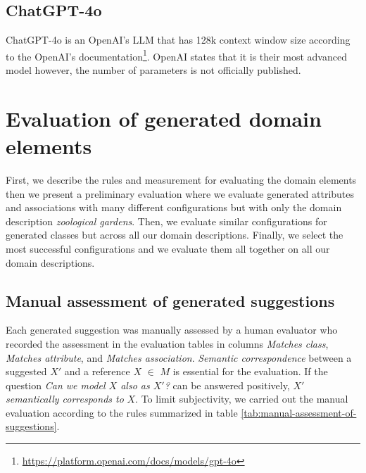 \subsection{ChatGPT-4o}

ChatGPT-4o is an OpenAI's LLM that has 128k context window size according to the OpenAI's documentation\footnote{\url{https://platform.openai.com/docs/models/gpt-4o}}. OpenAI states that it is their most advanced model however, the number of parameters is not officially published.


\section{Evaluation of generated domain elements}

First, we describe the rules and measurement for evaluating the domain elements then we present a preliminary evaluation where we evaluate generated attributes and associations with many different configurations but with only the domain description \textit{zoological gardens}. Then, we evaluate similar configurations for generated classes but across all our domain descriptions. Finally, we select the most successful configurations and we evaluate them all together on all our domain descriptions.


\subsection{Manual assessment of generated suggestions}

Each generated suggestion was manually assessed by a human evaluator who recorded the assessment in the evaluation tables in columns \emph{Matches class}, \emph{Matches attribute}, and \emph{Matches association}.
\emph{Semantic correspondence} between a suggested $X'$ and a reference $X$ $\in$ $M$ is essential for the evaluation.
If the question \emph{Can we model $X$ also as $X'$?} can be answered positively, $X'$ \emph{semantically corresponds to} $X$. To limit subjectivity, we carried out the manual evaluation according to the rules summarized in table \ref{tab:manual-assessment-of-suggestions}.

